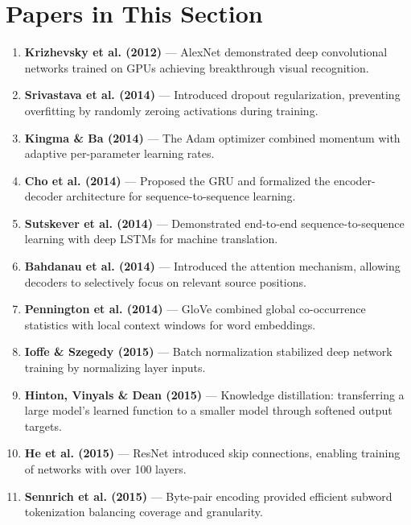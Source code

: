 \section*{Papers in This Section}

\begin{enumerate}
\item \textbf{Krizhevsky et al. (2012)} --- AlexNet demonstrated deep convolutional networks trained on GPUs achieving breakthrough visual recognition.

\item \textbf{Srivastava et al. (2014)} --- Introduced dropout regularization, preventing overfitting by randomly zeroing activations during training.

\item \textbf{Kingma \& Ba (2014)} --- The Adam optimizer combined momentum with adaptive per-parameter learning rates.

\item \textbf{Cho et al. (2014)} --- Proposed the GRU and formalized the encoder-decoder architecture for sequence-to-sequence learning.

\item \textbf{Sutskever et al. (2014)} --- Demonstrated end-to-end sequence-to-sequence learning with deep LSTMs for machine translation.

\item \textbf{Bahdanau et al. (2014)} --- Introduced the attention mechanism, allowing decoders to selectively focus on relevant source positions.

\item \textbf{Pennington et al. (2014)} --- GloVe combined global co-occurrence statistics with local context windows for word embeddings.

\item \textbf{Ioffe \& Szegedy (2015)} --- Batch normalization stabilized deep network training by normalizing layer inputs.

\item \textbf{Hinton, Vinyals \& Dean (2015)} --- Knowledge distillation: transferring a large model's learned function to a smaller model through softened output targets.

\item \textbf{He et al. (2015)} --- ResNet introduced skip connections, enabling training of networks with over 100 layers.

\item \textbf{Sennrich et al. (2015)} --- Byte-pair encoding provided efficient subword tokenization balancing coverage and granularity.
\end{enumerate}

